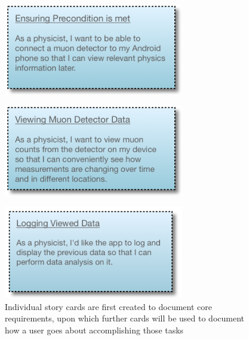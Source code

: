 \documentclass[11pt,a4paper]{article}
\begin{document}
\newpage


\begin{figure}[h]
  \centering
  
      \includegraphics[width=0.7\textwidth]{storycard1.png}
  
\end{figure}

\begin{figure}[h]
  \centering
  
      \includegraphics[width=0.7\textwidth]{storycard2.png}
     
  
\end{figure}

\begin{figure}[h]
  \centering
  
      \includegraphics[width=0.7\textwidth]{storycard3.png}
      \caption{Individual story cards are first created to document core requirements, upon which further cards will be used to document how a user goes about accomplishing those tasks}
  
\end{figure}
\end{document}
